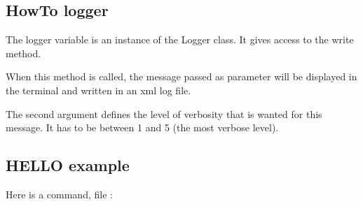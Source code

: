 \documentclass[a4paper,10pt,english]{sphinxmanual}
\begin{document}
%
\begin{sphinxVerbatim}[commandchars=\\\{\}]
\end{sphinxVerbatim}


\subsection{HowTo logger}
\label{\detokenize{write_command:howto-logger}}
The logger variable is an instance of the Logger class.
It gives access to the write method.

When this method is called, the message passed as parameter
will be displayed in the terminal and written in an xml log file.

%
\begin{sphinxVerbatim}[commandchars=\\\{\}]
  
\end{sphinxVerbatim}

The second argument defines the level of verbosity
that is wanted for this message.
It has to be between 1 and 5 (the most verbose level).


\subsection{HELLO example}
\label{\detokenize{write_command:hello-example}}
Here is a  command, file :
\end{document}

